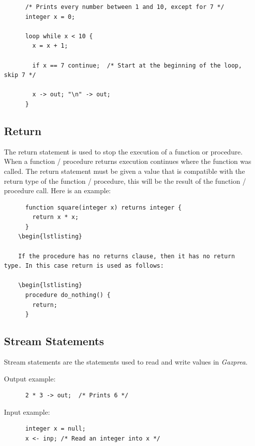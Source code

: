 \documentclass{article}
\begin{document}
    \begin{lstlisting}
      /* Prints every number between 1 and 10, except for 7 */
      integer x = 0;

      loop while x < 10 {
        x = x + 1;

        if x == 7 continue;  /* Start at the beginning of the loop, skip 7 */

        x -> out; "\n" -> out;
      }
    \end{lstlisting}


  \subsection{Return}\label{sec:return}

    The return statement is used to stop the execution of a function or procedure.  When a function / procedure
    returns execution continues where the function was called. The return statement must be given a value that is
    compatible with the return type of the function / procedure, this will be the result of the function / procedure
    call. Here is an example:

    \begin{lstlisting}
      function square(integer x) returns integer {
        return x * x;
      }
    \begin{lstlisting}

    If the procedure has no returns clause, then it has no return type. In this case return is used as follows:

    \begin{lstlisting}
      procedure do_nothing() {
        return;
      }
    \end{lstlisting}


  \subsection{Stream Statements}

    Stream statements are the statements used to read and write values in \textit{Gazprea}.

    Output example:

    \begin{lstlisting}
      2 * 3 -> out;  /* Prints 6 */
    \end{lstlisting}

    Input example:

    \begin{lstlisting}
      integer x = null;
      x <- inp; /* Read an integer into x */
    \end{lstlisting}
\end{document}
